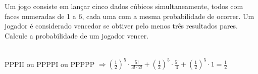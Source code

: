 \begin{ex}
 	Um jogo consiste em lançar cinco dados cúbicos simultaneamente, todos com faces numeradas de 1 a 6, cada uma com a mesma probabilidade de ocorrer. Um jogador é considerado vencedor se obtiver pelo menos três resultados pares. Calcule a probabilidade de um jogador vencer.
 	  \begin{sol}
 	  \phantom{A}  \\
 	  PPPII ou PPPPI ou PPPPP 
 	  $\Longrightarrow(\frac{1}{2})^5\cdot\frac{5!}{3!\cdot2!}+(\frac{1}{2})^5\cdot\frac{5!}{4}+(\frac{1}{2})^5\cdot1 =\frac{1}{2}$
 	  \end{sol}
\end{ex}